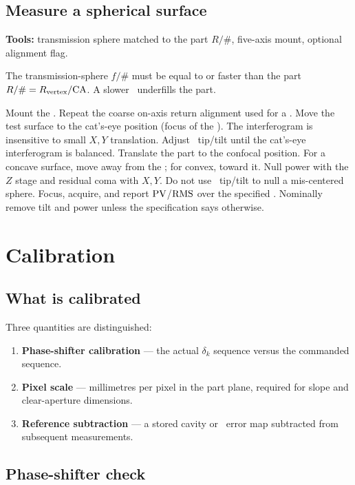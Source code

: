 \section{Measure a spherical surface}

\textbf{Tools:} transmission sphere matched to the part \(R/\#\), five-axis mount, optional alignment flag.

The transmission-sphere \(f/\#\) must be equal to or faster than the part \(R/\# = R_{\mathrm{vertex}}/\mathrm{CA}\). A slower \TS\ underfills the part.

\resetsteps
\stepn Mount the \TS. Repeat the coarse on-axis return alignment used for a \TF.
\stepn Move the test surface to the cat's-eye position (focus of the \TS). The interferogram is insensitive to small \(X,Y\) translation.
\stepn Adjust \TS\ tip/tilt until the cat's-eye interferogram is balanced.
\stepn Translate the part to the confocal position. For a concave surface, move away from the \TS; for convex, toward it.
\stepn Null power with the \(Z\) stage and residual coma with \(X,Y\). Do not use \TS\ tip/tilt to null a mis-centered sphere.
\stepn Focus, acquire, and report \(\mathrm{PV}\)/\(\mathrm{RMS}\) over the specified \CA. Nominally remove tilt and power unless the specification says otherwise.

\chapter{Calibration}
\label{ch:cal}

\section{What is calibrated}

Three quantities are distinguished:

\begin{enumerate}
  \item \textbf{Phase-shifter calibration} --- the actual \(\delta_k\) sequence versus the commanded sequence.
  \item \textbf{Pixel scale} --- millimetres per pixel in the part plane, required for slope and clear-aperture dimensions.
  \item \textbf{Reference subtraction} --- a stored cavity or \TF\ error map subtracted from subsequent measurements.
\end{enumerate}

\section{Phase-shifter check}

